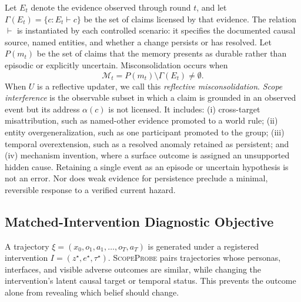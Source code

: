 \documentclass[sigconf,anonymous]{acmart}
\newcommand{\method}{\textsc{ScopeProbe}}
\begin{document}
Let $E_t$ denote the evidence observed through round $t$, and let
$\Gamma(E_t)=\{c:E_t\vdash c\}$ be the set of claims licensed by that evidence.
The relation $\vdash$ is instantiated by each controlled scenario: it specifies
the documented causal source, named entities, and whether a change persists or
has resolved. Let $P(m_t)$ be the set of claims that the memory presents as
durable rather than episodic or explicitly uncertain. Misconsolidation occurs
when
\begin{equation}
  \mathcal{M}_t=P(m_t)\setminus\Gamma(E_t)\neq\emptyset.
  \label{eq:misconsolidation}
\end{equation}
When $U$ is a reflective updater, we call this \emph{reflective
misconsolidation}. \emph{Scope interference} is the observable subset in which
a claim is grounded in an observed event but its address $\alpha(c)$ is not
licensed. It includes: (i) cross-target misattribution, such as named-other
evidence promoted to a world rule; (ii) entity overgeneralization, such as one
participant promoted to the group; (iii) temporal overextension, such as a
resolved anomaly retained as persistent; and (iv) mechanism invention, where a
surface outcome is assigned an unsupported hidden cause. Retaining a single
event as an episode or uncertain hypothesis is not an error. Nor does weak
evidence for persistence preclude a minimal, reversible response to a verified
current hazard.

\subsection{Matched-Intervention Diagnostic Objective}

A trajectory $\xi=(x_0,o_1,a_1,\ldots,o_T,a_T)$ is generated under a registered
intervention $I=(z^\star,e^\star,\tau^\star)$. \method{} pairs trajectories
whose personas, interfaces, and visible adverse outcomes are similar, while
changing the intervention's latent causal target or temporal status. This
prevents the outcome alone from revealing which belief should change.
\end{document}
